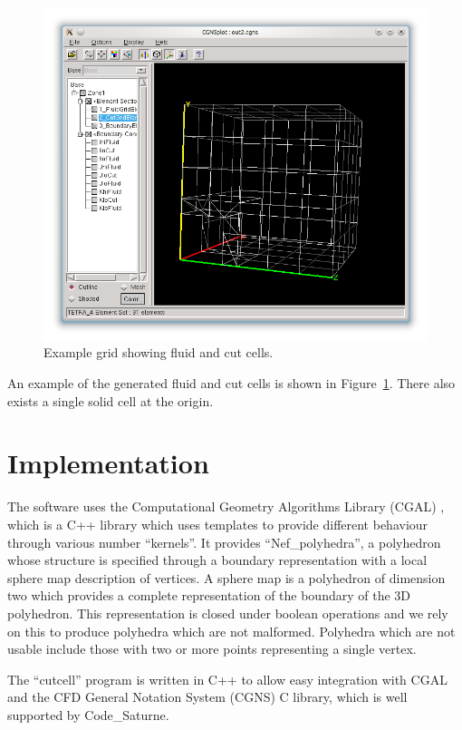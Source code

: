 \documentclass[a4paper,10pt]{article}
\begin{document}
\begin{figure}[htb]
 \centering
 \includegraphics[width=\textwidth,keepaspectratio=true]{./cutcellplot.pdf}
 \caption{Example grid showing fluid and cut cells.}
 \label{fig:plot}
\end{figure}

An example of the generated fluid and cut cells is shown in
Figure~\ref{fig:plot}. There also exists a single solid cell at the origin.

\section{Implementation}

The software uses the Computational Geometry Algorithms Library (CGAL)
\cite{cgal}, which is a C++ library which uses templates to provide different
behaviour through various number ``kernels''. It provides ``Nef\_polyhedra'', a
polyhedron whose structure is specified through a boundary representation
with a local sphere map description of vertices. A sphere map is a polyhedron of
dimension two which provides a complete representation of the boundary of the 3D
polyhedron. This representation is closed under boolean operations and we rely
on this to produce polyhedra which are not malformed. Polyhedra which are not
usable include those with two or more points representing a single vertex.

The ``cutcell'' program is written in C++ to allow easy integration with CGAL
and the CFD General Notation System (CGNS) \cite{cgns} C library, which is well
supported by Code\_Saturne.
\end{document}
